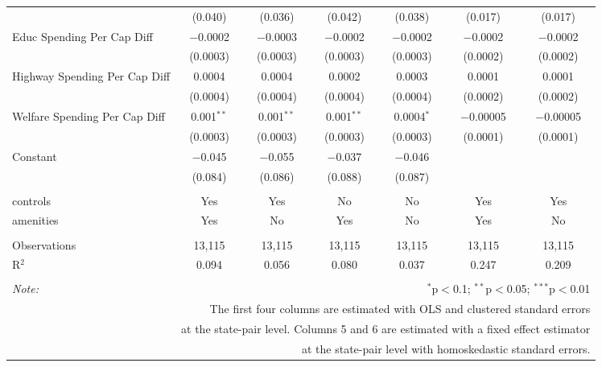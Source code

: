 \begin{table}[!htbp]
\begin{tabular}{@{\extracolsep{5pt}}lcccccc}
  & (0.040) & (0.036) & (0.042) & (0.038) & (0.017) & (0.017) \\ 
  Educ Spending Per Cap Diff & $-$0.0002 & $-$0.0003 & $-$0.0002 & $-$0.0002 & $-$0.0002 & $-$0.0002 \\ 
  & (0.0003) & (0.0003) & (0.0003) & (0.0003) & (0.0002) & (0.0002) \\ 
  Highway Spending Per Cap Diff & 0.0004 & 0.0004 & 0.0002 & 0.0003 & 0.0001 & 0.0001 \\ 
  & (0.0004) & (0.0004) & (0.0004) & (0.0004) & (0.0002) & (0.0002) \\ 
  Welfare Spending Per Cap Diff & 0.001$^{**}$ & 0.001$^{**}$ & 0.001$^{**}$ & 0.0004$^{*}$ & $-$0.00005 & $-$0.00005 \\ 
  & (0.0003) & (0.0003) & (0.0003) & (0.0003) & (0.0001) & (0.0001) \\ 
  Constant & $-$0.045 & $-$0.055 & $-$0.037 & $-$0.046 &  &  \\ 
  & (0.084) & (0.086) & (0.088) & (0.087) &  &  \\ 
 \hline \\[-1.8ex] 
controls & Yes & Yes & No & No & Yes & Yes \\ 
amenities & Yes & No & Yes & No & Yes & No \\ 
\hline \\[-1.8ex] 
Observations & 13,115 & 13,115 & 13,115 & 13,115 & 13,115 & 13,115 \\ 
R$^{2}$ & 0.094 & 0.056 & 0.080 & 0.037 & 0.247 & 0.209 \\ 
\hline 
\hline \\[-1.8ex] 
\textit{Note:}  & \multicolumn{6}{r}{$^{*}$p$<$0.1; $^{**}$p$<$0.05; $^{***}$p$<$0.01} \\ 
 & \multicolumn{6}{r}{The first four columns are estimated with OLS and clustered standard errors} \\ 
 & \multicolumn{6}{r}{at the state-pair level. Columns 5 and 6 are estimated with a fixed effect estimator} \\ 
 & \multicolumn{6}{r}{at the state-pair level with homoskedastic standard errors.} \\ 
\end{tabular} 
\end{table} 
